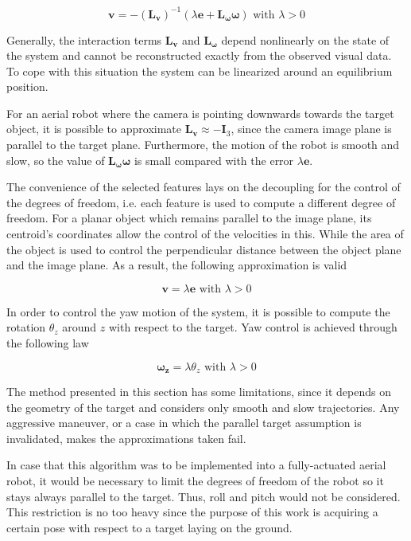 \begin{equation}
\bm{v} = - (\bm{L_v})^{-1} (\lambda \bm{e} + \bm{L_\omega} \bm{\omega}) \text{ with } \lambda > 0
\end{equation}

Generally, the interaction terms $\bm{L_v}$ and $\bm{L_\omega}$ depend nonlinearly on the state of the system and cannot be reconstructed exactly from the observed visual data. To cope with this situation the system can be linearized around an equilibrium position.

For an aerial robot where the camera is pointing downwards towards the target object, it is possible to approximate $\bm{L_v} \approx - \bm{I}_3$, since the camera image plane is parallel to the target plane. Furthermore, the motion of the robot is smooth and slow, so the value of $\bm{L_\omega} \bm{\omega}$ is small compared with the error $\lambda \bm{e}$. 


The convenience of the selected features lays on the decoupling for the control of the degrees of freedom, i.e. each feature is used to compute a different degree of freedom. For a planar object which remains parallel to the image plane, its centroid's coordinates allow the control of the velocities in this. While the area of the object is used to control the perpendicular distance between the object plane and the image plane. As a result, the following approximation is valid

\begin{equation}
\bm{v} = \lambda \bm{e} \text{ with } \lambda > 0
\end{equation}

In order to control the yaw motion of the system, it is possible to compute the rotation $\theta_z$ around $z$ with respect to the target. Yaw control is achieved through the following law

\begin{equation}
\bm{\omega_z} = \lambda \theta_z \text{ with } \lambda > 0
\end{equation}

The method presented in this section has some limitations, since it depends on the geometry of the target and considers only smooth and slow trajectories. Any aggressive maneuver, or a case in which the parallel target assumption is invalidated, makes the approximations taken fail.

In case that this algorithm was to be implemented into a fully-actuated aerial robot, it would be necessary to limit the degrees of freedom of the robot so it stays always parallel to the target. Thus, roll and pitch would not be considered. This restriction is no too heavy since the purpose of this work is acquiring a certain pose with respect to a target laying on the ground. 

